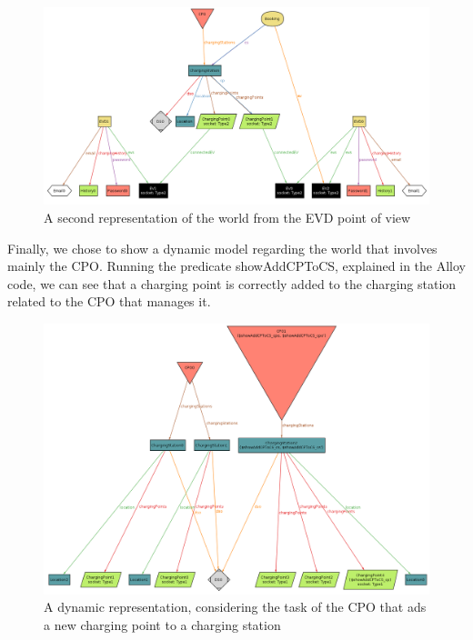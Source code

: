 \begin{figure}[H]
    \centering
    \includegraphics[width=1\textwidth]{Images/cp4/EVDWorldWithBookingAndChargeNow.png}
    \caption{A second representation of the world from the EVD point of view}
\end{figure}

Finally, we chose to show a dynamic model regarding the world that involves mainly the CPO. Running the predicate showAddCPToCS, explained in the Alloy code, we can see that a charging point is correctly added to the charging station related to the CPO that manages it.
\begin{figure}[H]
    \centering
    \includegraphics[width=1\textwidth]{Images/cp4/DynamicWorldAddCPToCS.png}
    \caption{A dynamic representation, considering the task of the CPO that ads a new charging point to a charging station}
\end{figure}